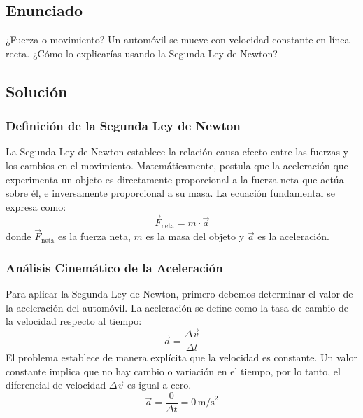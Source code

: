 \documentclass[12pt]{article}
\begin{document}
\newpage

\subsection*{Enunciado}
¿Fuerza o movimiento? Un automóvil se mueve con velocidad constante en línea recta. ¿Cómo lo explicarías usando la Segunda Ley de Newton?

\subsection*{Solución}

\subsubsection*{Definición de la Segunda Ley de Newton}
La Segunda Ley de Newton establece la relación causa-efecto entre las fuerzas y los cambios en el movimiento. Matemáticamente, postula que la aceleración que experimenta un objeto es directamente proporcional a la fuerza neta que actúa sobre él, e inversamente proporcional a su masa. La ecuación fundamental se expresa como:
\begin{equation}
    \vec{F}_{\text{neta}} = m \cdot \vec{a}
\end{equation}
donde $\vec{F}_{\text{neta}}$ es la fuerza neta, $m$ es la masa del objeto y $\vec{a}$ es la aceleración.

\subsubsection*{Análisis Cinemático de la Aceleración}
Para aplicar la Segunda Ley de Newton, primero debemos determinar el valor de la aceleración del automóvil. La aceleración se define como la tasa de cambio de la velocidad respecto al tiempo:
\begin{equation}
    \vec{a} = \frac{\Delta \vec{v}}{\Delta t}
\end{equation}
El problema establece de manera explícita que la velocidad es constante. Un valor constante implica que no hay cambio o variación en el tiempo, por lo tanto, el diferencial de velocidad $\Delta \vec{v}$ es igual a cero.
\begin{equation}
    \vec{a} = \frac{0}{\Delta t} = 0 \, \text{m/s}^2
\end{equation}
\end{document}
